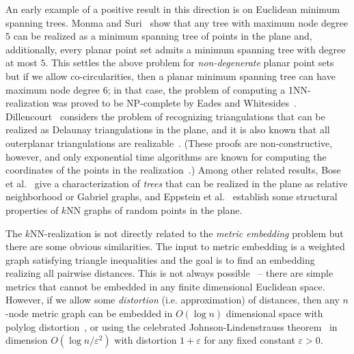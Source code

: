 \documentclass[11pt]{article}
\begin{document}
An early example of a positive result in this direction is on Euclidean minimum spanning trees. Monma and Suri~\cite{monma:1992} show that any tree with maximum node degree $5$ can be realized as a minimum spanning tree of points in the plane and, additionally, every planar point set admits a minimum spanning tree with degree at most $5$. This settles the above problem for \textit{non-degenerate} planar point sets but if we allow co-circularities, then a planar minimum spanning tree can have maximum node degree $6$; in that case, the problem of computing a 1NN-realization was proved to be NP-complete by Eades and Whitesides~\cite{eades:1994}.
Dillencourt~\cite{dillencourt:1990} considers the problem of recognizing triangulations that can be realized as Delaunay triangulations in the plane, and it is also known that all outerplanar triangulations are realizable~\cite{sugihara:1994}. (These proofs are non-constructive, however, and only exponential time algorithms are known for computing the coordinates of the points in the realization~\cite{agrawal:2022}.)
Among other related results, Bose et al.~\cite{Jit-prox} give a characterization of  \emph{trees} that can be realized in the plane as relative neighborhood or Gabriel graphs, and Eppstein et al.~\cite{Epps-nn} establish some  structural properties of $k$NN graphs of random points in the plane.

The $k$NN-realization is not directly related to the
\emph{metric embedding} problem but there are some obvious similarities. The input to metric embedding is a weighted graph satisfying triangle inequalities and the goal is to find an embedding realizing all pairwise distances. This is not always possible~\cite{matousek-book} -- there are simple metrics that cannot be embedded in any finite dimensional Euclidean space. However, if we allow some \emph{distortion} (i.e. approximation) of distances, then any $n$-node metric graph can be embedded in $O(\log n)$ dimensional space with polylog distortion~\cite{bourgain}, or using the celebrated Johnson-Lindenstrauss theorem~\cite{johnson:1984} in dimension $O(\log n /\varepsilon^2 )$ with distortion $1 + \varepsilon$ for any fixed constant $\varepsilon > 0$.
\end{document}
